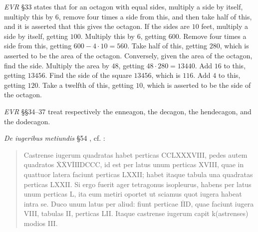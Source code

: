 \documentclass{article}
\theoremstyle{definition}
\begin{document}
{\em EVR} \S 33 \cite[pp.~178--179]{guillaumin} states that for an octagon with equal sides, 
multiply a side by itself, multiply this by $6$, remove four times a side from this, and then take half of this, and it is asserted that this gives the octagon.
If the sides are $10$ feet, multiply a side by itself, getting $100$. Multiply this by $6$, getting $600$. Remove four times a side from this,
getting $600-4\cdot 10=560$. Take half of this, getting $280$, which is asserted to be the area of the octagon. Conversely,
given the area of the octagon, find the side. Multiply the area by $48$, getting $48 \cdot 280 = 13440$. Add $16$ to this, getting $13456$. Find the side
of the square $13456$, which is $116$. Add $4$ to this, getting $120$. Take a twelfth of this, getting $10$, which is asserted to be the side
of the octagon. 

{\em EVR} \S \S 34--37 \cite[pp.~180--187]{guillaumin} treat respectively the enneagon, the decagon, the hendecagon, and the dodecagon. 

{\em De iugeribus metiundis} \S 54 \cite[pp.~198--201]{guillaumin}, cf.  \cite[p.~354--356]{blumeI}:

\begin{quote}
Castrense iugerum quadratas habet perticas CCLXXXVIII, pedes autem quadratos $\overline{\text{X}} \overline{\text{X}} \overline{\text{VIII}}$DCCC, 
id est per latus unum perticas XVIII, quae in quattuor latera faciunt perticas LXXII; habet itaque tabula una quadratas perticas LXXII. Si ergo
fuerit ager tetragonus isopleurus, habens per latus unum perticas L, ita eum metiri oportet ut sciamus quot iugera habeat intra se. Duco unum latus
per aliud: fiunt perticae $\overline{\text{II}}$D, quae faciunt iugera VIII, tabulas II, perticas LII. Itaque castrense iugerum capit k(astrenses) modios III.
\end{quote}
\end{document}
